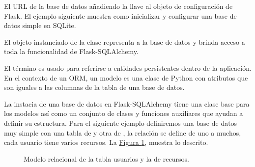 El URL de la base de datos añadiendo la llave  al
objeto de configuración de Flask. El ejemplo siguiente muestra como inicializar
y configurar una base de datos simple en SQLite.

\begin{sphinxVerbatim}[commandchars=\\\{\}]
   
  
\PYG{p}{[}\PYG{p}{]} \PYGZbs{}
  
\end{sphinxVerbatim}

El objeto  instanciado de la clase  representa a la base
de datos y brinda acceso a toda la funcionalidad de Flask-SQLAlchemy.


El término  es usado para referirse a entidades persistentes dentro de la
aplicación. En el contexto de un ORM, un modelo es una clase de Python con
atributos que son iguales a las columnas de la tabla de una base de datos.

La instacia de una base de datos en Flask-SQLAlchemy tiene una clase base
para los modelos así como un conjunto de clases y funciones auxiliares que
ayudan a definir su estructura. Para el siguiente ejemplo definiremos una
base de datos muy simple con una tabla de  y otra de ,
la relación se define de uno a muchos, cada usuario tiene varios recursos.
La \hyperref[\detokenize{chapter_two/desc_cloudnao:relationship-example}]{Figura \ref{\detokenize{chapter_two/desc_cloudnao:relationship-example}}}, muestra lo descrito.

\begin{figure}[htbp]
\centering
\capstart

\noindent{}
\caption{Modelo relacional de la tabla usuarios y la de recursos.}\label{\detokenize{chapter_two/desc_cloudnao:relationship-example}}\end{figure}

